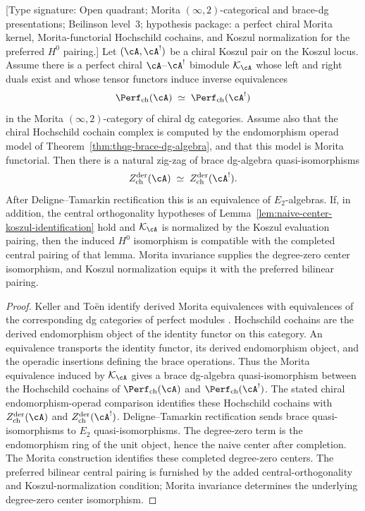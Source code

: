 \begin{proposition}
\label{prop:derived-center-morita-criterion}
\textup{[Type signature: Open quadrant; Morita
\((\infty,2)\)-categorical and brace-dg presentations; Beilinson
level~\(3\); hypothesis package: a perfect chiral Morita kernel,
Morita-functorial Hochschild cochains, and Koszul normalization for
the preferred \(H^0\) pairing.]}
Let $(\cA,\cA^!)$ be a chiral Koszul pair on the Koszul locus. Assume
there is a perfect chiral $\cA$--$\cA^!$ bimodule
$\mathcal K_{\cA}$ whose left and right duals exist and whose tensor
functors induce inverse equivalences
\[
 \Perf_{\mathrm{ch}}(\cA)
 \;\simeq\;
 \Perf_{\mathrm{ch}}(\cA^!)
\]
in the Morita $(\infty,2)$-category of chiral dg categories. Assume
also that the chiral Hochschild cochain complex is computed by the
endomorphism operad model of
Theorem~\ref{thm:thqg-brace-dg-algebra}, and that this model is
Morita functorial. Then there is a natural zig-zag of brace
dg-algebra quasi-isomorphisms
\[
 Z^{\mathrm{der}}_{\mathrm{ch}}(\cA)
 \;\simeq\;
 Z^{\mathrm{der}}_{\mathrm{ch}}(\cA^!).
\]
After Deligne--Tamarkin rectification this is an equivalence of
$E_2$-algebras. If, in addition, the central orthogonality
hypotheses of Lemma~\ref{lem:naive-center-koszul-identification}
hold and $\mathcal K_{\cA}$ is normalized by the Koszul evaluation
pairing, then the induced $H^0$ isomorphism is compatible with the
completed central pairing of that lemma. Morita invariance supplies
the degree-zero center isomorphism, and Koszul normalization equips
it with the preferred bilinear pairing.
\end{proposition}

\begin{proof}
Keller and To\"en identify derived Morita equivalences with
equivalences of the corresponding dg categories of perfect modules
\cite{Keller06,Toen07}. Hochschild cochains are the derived
endomorphism object of the identity functor on this category. An
equivalence transports the identity functor, its derived endomorphism
object, and the operadic insertions defining the brace operations.
Thus the Morita equivalence induced by $\mathcal K_{\cA}$ gives a
brace dg-algebra quasi-isomorphism between the Hochschild cochains of
$\Perf_{\mathrm{ch}}(\cA)$ and $\Perf_{\mathrm{ch}}(\cA^!)$.
The stated chiral endomorphism-operad comparison identifies these
Hochschild cochains with
$Z^{\mathrm{der}}_{\mathrm{ch}}(\cA)$ and
$Z^{\mathrm{der}}_{\mathrm{ch}}(\cA^!)$. Deligne--Tamarkin
rectification sends brace quasi-isomorphisms to $E_2$
quasi-isomorphisms. The degree-zero term is the endomorphism ring of
the unit object, hence the naive center after completion. The Morita
construction identifies these completed degree-zero centers. The
preferred bilinear central pairing is furnished by the added
central-orthogonality and Koszul-normalization condition; Morita
invariance determines the underlying degree-zero center isomorphism.
\end{proof}

